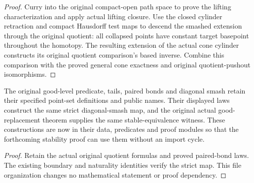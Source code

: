 \begin{proof}
  Curry into the original compact-open path space to prove the lifting characterization and apply actual lifting closure. Use the closed cylinder retraction and compact Hausdorff test maps to descend the smashed extension through the original quotient: all collapsed points have constant target basepoint throughout the homotopy. The resulting extension of the actual cone cylinder constructs its original quotient comparison's based inverse. Combine this comparison with the proved general cone exactness and original quotient-pushout isomorphisms.
  \leanok
\end{proof}

\begin{proposition}
  \label{prop:actual-original-diagonal-smash-construction}
  \leanok
  The original good-level predicate, tails, paired bonds and diagonal smash retain their specified point-set definitions and public names. Their displayed laws construct the same strict diagonal-smash map, and the original actual good-replacement theorem supplies the same stable-equivalence witness. These constructions are now in their data, predicates and proof modules so that the forthcoming stability proof can use them without an import cycle.
\end{proposition}
\begin{proof}
  Retain the actual original quotient formulas and proved paired-bond laws. The existing boundary and naturality identities verify the strict map. This file organization changes no mathematical statement or proof dependency.
  \leanok
\end{proof}

